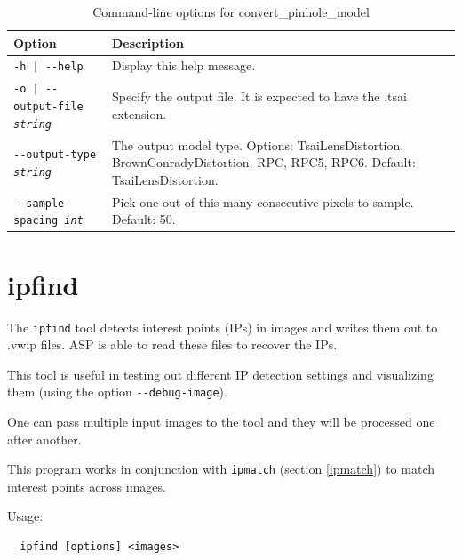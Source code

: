 \begin{longtable}{|l|p{7.5cm}|}
\caption{Command-line options for convert\_pinhole\_model}
\label{tbl:convertpinholemodel}
\endfirsthead
\endhead
\endfoot
\endlastfoot
\hline
Option & Description \\ \hline \hline
\texttt{-h | -\/-help } & Display this help message.\\ \hline

\texttt{-o | -\/-output-file \textit{string} } & Specify the output file. It is expected to have the .tsai extension. \\ \hline

\texttt{-\/-output-type \textit{string}} & The output model type. Options: TsaiLensDistortion, 
BrownConradyDistortion, RPC, RPC5, RPC6. Default: TsaiLensDistortion.\\ \hline

\texttt{-\/-sample-spacing \textit{int}} & Pick one out of this many
consecutive pixels to sample. Default: 50. \\ \hline

\end{longtable}

\clearpage


\section{ipfind}
\label{ipfind}

The \texttt{ipfind} tool detects interest points (IPs) in images and writes them out to .vwip files.
ASP is able to read these files to recover the IPs.  

This tool is useful in testing out different IP detection settings and visualizing them (using the option \texttt{-\/-debug-image}).

One can pass multiple input images to the tool and they will be processed one after another.

This program works in conjunction with \texttt{ipmatch} (section \ref{ipmatch}) to match interest points across images.

Usage:
\begin{verbatim}
  ipfind [options] <images>
\end{verbatim}

